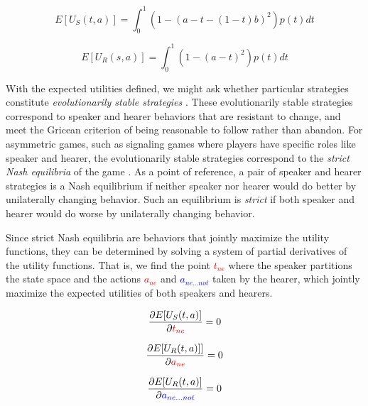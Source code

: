 \documentclass[linguex]{sp}
\theoremstyle{definition} \newtheorem{definition}{Definition}
\begin{document}
\begin{equation}
     E[U_S(t, a)] = \int_0^1 \left( 1 -(a - t - (1-t)b)^2 \right)p(t)dt
\end{equation}

\begin{equation}
      E[U_R(s, a)] = \int_0^1 \left( 1 -(a - t)^2 \right) p(t) dt
\end{equation}

With the expected utilities defined, we might ask whether particular strategies constitute \emph{evolutionarily stable strategies} \citep{maynard-smith1982}. These evolutionarily stable strategies correspond to speaker and hearer behaviors that are resistant to change, and meet the Gricean \citeyearpar[29]{grice1975} criterion of being reasonable to follow rather than abandon. For asymmetric games, such as signaling games where players have specific roles like speaker and hearer, the evolutionarily stable strategies correspond to the \emph{strict Nash equilibria} of the game \citep{selten:1980}.  As a point of reference, a pair of speaker and hearer strategies is a Nash equilibrium if neither speaker nor hearer would do better by unilaterally changing behavior. Such an equilibrium is \emph{strict} if both speaker and hearer would do worse by unilaterally changing behavior.  

Since strict Nash equilibria are behaviors that jointly maximize the utility functions, they can be determined by solving a system of partial derivatives of the utility functions. That is, we find the point \emph{\textcolor{red}{$t_{ne}$}} where the speaker partitions the state space and the actions \emph{\textcolor{red}{$a_{ne}$}} and \emph{\textcolor{blue}{$a_{ne...not}$}} taken by the hearer, which jointly maximize the expected utilities of both speakers and hearers.

\begin{equation}
	\frac{\partial E[U_S(t, a)]}{\partial \emph{\textcolor{red}{$t_{ne}$}}} =  0 \\
\end{equation}

\begin{equation}
	\frac{\partial E[U_R(t, a)]]}{\partial \emph{\textcolor{red}{$a_{ne}$}}} = 0 \\
\end{equation}


\begin{equation}
	\frac{\partial E[U_R(t, a)]}{\partial \emph{\textcolor{blue}{$a_{ne...not}$}}} = 0
\end{equation}
\end{document}
